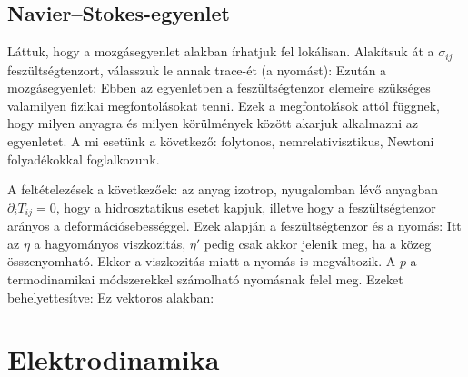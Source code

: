   \subsection{Navier--Stokes-egyenlet}
   
   Láttuk, hogy a mozgásegyenlet  alakban írhatjuk fel lokálisan.
   Alakítsuk át a $\sigma_{ij}$ feszültségtenzort, válasszuk le annak trace-ét (a nyomást):
   Ezután a mozgásegyenlet:
   Ebben az egyenletben a feszültségtenzor elemeire szükséges valamilyen fizikai megfontolásokat tenni.
   Ezek a megfontolások attól függnek, hogy milyen anyagra és milyen körülmények között akarjuk alkalmazni az egyenletet.
   A mi esetünk a következő: folytonos, nemrelativisztikus, Newtoni folyadékokkal foglalkozunk.
   
   A feltételezések a következőek: az anyag izotrop, nyugalomban lévő anyagban $\partial_i T_{ij}=0$, hogy a hidrosztatikus esetet kapjuk, illetve hogy a feszültségtenzor arányos a deformációsebességgel.
   Ezek alapján a feszültségtenzor és a nyomás:
   Itt az $\eta$ a hagyományos viszkozitás, $\eta'$ pedig csak akkor jelenik meg, ha a közeg összenyomható.
   Ekkor a viszkozitás miatt a nyomás is megváltozik.
   A $p$ a termodinamikai módszerekkel számolható nyomásnak felel meg.
   Ezeket behelyettesítve:
   Ez vektoros alakban:
    
 \section{Elektrodinamika}
 
